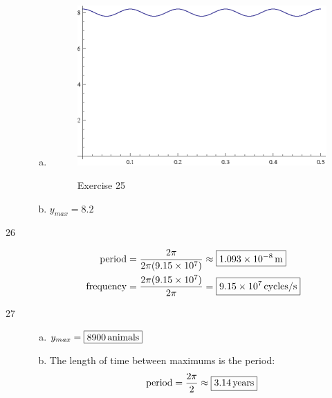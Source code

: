 \documentclass{exam}
\begin{document}
\begin{description}
\begin{enumerate}[(a)]
          \item 
            \begin{figure}[H]
              \centering
              \includegraphics{exercise25.eps}

              Exercise 25
            \end{figure}

          \item $y_{max} = \boxed{ 8.2 }$

        \end{enumerate}

      \item[26]
        \begin{align*}
          \text{period}    & = \frac{2 \pi}{2 \pi (9.15 \times 10^7)} \approx \boxed{ \unit[1.093 \times 10^{-8}]{m} } \\
          \text{frequency} & = \frac{2 \pi (9.15 \times 10^7)}{2 \pi} = \boxed{ \unit[9.15 \times 10^7]{cycles/s} } \\
        \end{align*}

      \item[27]
        \begin{enumerate}[(a)]
          \item $y_{max} = \boxed{ \unit[8900]{animals} }$

          \item The length of time between maximums is the period:
            \[
              \text{period} = \frac{2 \pi}{2} \approx \boxed{ \unit[3.14]{years} } \\
            \]
        \end{enumerate}


\end{description}
\end{document}
